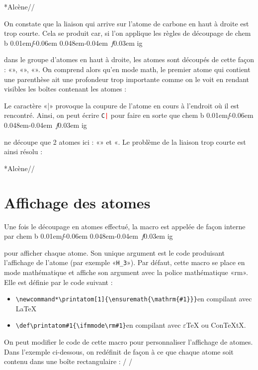 \documentclass[10pt,french]{article}
\makeatletter
\newcommand\make@car@active[1]{%
	\catcode`#1\active
	\begingroup
		\lccode`\~`#1\relax
		\lowercase{\endgroup\def~}%
}
\newif\if@exstar
\newcommand\exemple{%
	\begingroup
	\parskip\z@
	\@makeother\;\@makeother\!\@makeother\?\@makeother\:%
	\@ifstar{\@exstartrue\exemple@}{\@exstarfalse\exemple@}}
\newcommand\exemple@[2][65]{%
	\medbreak\noindent
	\begingroup
		\let\do\@makeother\dospecials
		\make@car@active\ { {}}%
		\make@car@active\^^M{\par\leavevmode}%
		\make@car@active\^^I{\space\space}%
		\make@car@active\,{\leavevmode\kern\z@\string,}%
		\make@car@active\-{\leavevmode\kern\z@\string-}%
		\make@car@active\>{\leavevmode\kern\z@\string>}%
		\make@car@active\<{\leavevmode\kern\z@\string<}%
		\exemple@@{#1}{#2}%
}
\newcommand\exemple@@[3]{%
	\def\@tempa##1#3{\exemple@@@{#1}{#2}{##1}}%
	\@tempa
}
\newcommand\exemple@@@[3]{%
	\xdef\the@code{#3}%
	\endgroup
	\if@exstar
		\begingroup
			\fboxrule0.4pt
			\let\breakboxparindent\z@
			\def\bkvz@bottom{\hrule\@height\fboxrule}%
			\let\bkvz@before@breakbox\relax
			\def\bkvz@set@linewidth{\advance\linewidth\dimexpr-2\fboxrule-2\fboxsep}%
			\def\bkvz@left{\vrule\@width\fboxrule\hskip\fboxsep}%
			\def\bkvz@right{\hskip\fboxsep\vrule\@width\fboxrule}%
			\def\bkvz@top{\hbox to \hsize{%
				\vrule\@width\fboxrule\@height\fboxrule
				\leaders\bkvz@bottom\hfill
				\sffamily
				\fboxsep\z@
				\colorbox{black}{\kern0.25em\color{white}\footnotesize\lower0.5ex\hbox{\strut#2}\kern0.25em}%
				\leaders\bkvz@bottom\hfill
				\vrule\@width\fboxrule\@height\fboxrule}}%
			\breakbox
				\kern.5ex\relax
				\ttfamily\footnotesize\the@code\par
				\normalfont
				\kern3pt
				\hrule height0.1pt width\linewidth depth0.1pt
				\vskip5pt
				\rightskip0pt plus 1fill
				\everypar{{\color{lightgray}\rlap{\vrule height0.1pt width\linewidth depth0.1pt}}\hskip0pt plus 1fill}%
				\newlinechar`\^^M\everyeof{\noexpand}\scantokens{#3}\par
			\endbreakbox
		\endgroup
	\else
		\vskip0.5ex
		\boxput*(0,1)
			{\fboxsep\z@
			\hbox{\sffamily\colorbox{black}{\leavevmode\kern0.25em{\color{white}\footnotesize\strut#2}\kern0.25em}}%
			}%
			{\fboxsep5pt
			\fbox{%
				$\vcenter{\hsize\dimexpr0.#1\linewidth-\fboxsep-\fboxrule\relax
					\kern5pt\parskip0pt \ttfamily\footnotesize\the@code}%
				\vcenter{\kern5pt\hsize\dimexpr\linewidth-0.#1\linewidth-\fboxsep-\fboxrule\relax
					\everypar{{\color{lightgray}\rlap{\vrule height0.1pt width\dimexpr\linewidth-0.#1\linewidth-\fboxsep-\fboxrule depth0.1pt}}}%
					\footnotesize\newlinechar`\^^M\everyeof{\noexpand}\scantokens{#3}}$%
				}%
			}%
	\fi
	\medbreak
	\endgroup
}
\newcommand\falseverb[1]{{\ttfamily\detokenize\expandafter{\string#1}}}
\DeclareRobustCommand\CF{%
	\textsf{%
		chem%
		\if\string b\detokenize\expandafter{\f@series}%
			\lower0.01em\hbox{\itshape f}\kern-0.06em
		\else
			\lower0.048em\hbox{\kern-0.04em \itshape f}\kern0.03em
		\fi ig%
		}%
		\xspace
}
\makeatother
\begin{document}
\exemple*{Alcène}//

On constate que la liaison qui arrive sur l'atome de carbone en haut à droite est trop courte. Cela se produit car, si l'on applique les règles de découpage de \CF dans le groupe d'atomes en haut à droite, les atomes sont découpés de cette façon : «\texttt{}», «\texttt{}», «\texttt{}». On comprend alors qu'en mode math, le premier atome qui contient une parenthèse ait une profondeur trop importante comme on le voit en rendant visibles les boîtes contenant les atomes :
\begin{center}
\fboxsep=0pt
\renewcommand*\printatom[1]{\fbox{\ensuremath{\mathrm{#1}}}}%
%
\end{center}
Le caractère «|» provoque la coupure de l'atome en cours à l'endroit où il est rencontré. Ainsi, on peut écrire \texttt{C\textcolor{red}{|}} pour faire en sorte que \CF ne découpe que 2 atomes ici : «\texttt{}» et «\texttt{}. Le problème de la liaison trop courte est ainsi résolu :

\exemple*{Alcène}//

\section{Affichage des atomes}\label{perso.affichage}
Une fois le découpage en atomes effectué, la macro \falseverb{\printatom} est appelée de façon interne par \CF pour afficher chaque atome. Son unique argument est le code produisant l'affichage de l'atome (par exemple «\verb-H_3-»). Par défaut, cette macro se place en mode mathématique et affiche son argument avec la police mathématique «rm». Elle est définie par le code suivant :
\begin{itemize}
	\item \verb|\newcommand*\printatom[1]{\ensuremath{\mathrm{#1}}}|\qquad en compilant avec \LaTeX{}
	\item \verb|\def\printatom#1{\ifmmode\rm#1\else$\rm#1$\fi}|\qquad en compilant avec $\varepsilon$\TeX{} ou Con\TeX tX.
\end{itemize}\medskip

On peut modifier le code de cette macro pour personnaliser l'affichage de atomes. Dans l'exemple ci-dessous, on redéfinit \falseverb{\printatom} de façon à ce que chaque atome soit contenu dans une boîte rectangulaire :
\exemple{Redéfinition de \string\printatom}/\fboxsep=1pt
\renewcommand*\printatom[1]{\fbox{\ensuremath{\mathrm{#1}}}}
/
\end{document}
